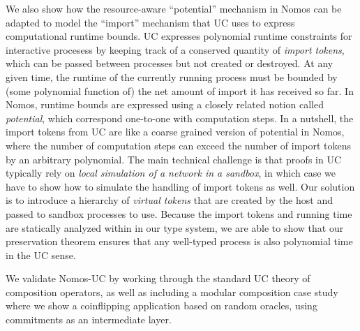 We also show how the resource-aware ``potential'' mechanism in Nomos can be adapted to model the ``import'' mechanism that UC uses to express computational runtime bounds.
UC expresses polynomial runtime constraints for interactive procesess by keeping track of a conserved quantity of \emph{import tokens}, which can be passed between processes but not created or destroyed. At any given time, the runtime of the currently running process must be bounded by (some polynomial function of) the net amount of import it has received so far.
In Nomos, runtime bounds are expressed using a closely related notion called \emph{potential}, which correspond one-to-one with computation steps. In a nutshell, the import tokens from UC are like a coarse grained version of potential in Nomos, where the number of computation steps can exceed the number of import tokens by an arbitrary polynomial.
The main technical challenge is that proofs in UC typically rely on \emph{local simulation of a network in a sandbox}, in which case we have to show how to simulate the handling of import tokens as well. Our solution is to introduce a hierarchy of \emph{virtual tokens} that are created by the host and passed to sandbox processes to use.
Because the import tokens and running time are statically analyzed within in our type system, we are able to show that our preservation theorem ensures that any well-typed process is also polynomial time in the UC sense.

We validate Nomos-UC by working through the standard UC theory of composition operators, as well as including a modular composition case study where we show a coinflipping application based on random oracles, using commitments as an intermediate layer.
